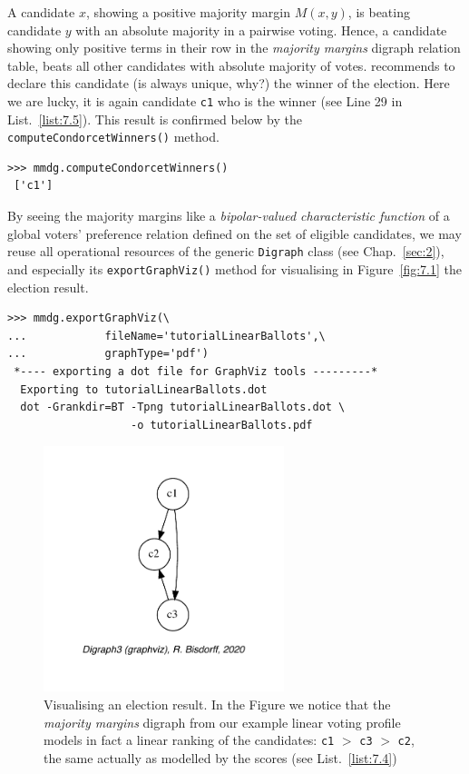 A candidate $x$, showing a positive majority margin $M(x,y)$, is beating candidate $y$  with an absolute majority in a pairwise voting. Hence, a candidate showing only positive terms in their row in the \emph{majority margins} digraph relation table, beats all other candidates with absolute majority of votes. \Condorcet recommends to declare this candidate (is always unique, why?) the winner of the election. Here we are lucky, it is again candidate \texttt{c1} who is the \Condorcet winner (see Line 29 in List.~\vref{list:7.5}). This result is confirmed below by the \texttt{computeCondorcetWinners()} method. 
\begin{lstlisting}
>>> mmdg.computeCondorcetWinners()
 ['c1']  
\end{lstlisting}    

By seeing the majority margins like a \emph{bipolar-valued characteristic function} of a global voters' preference relation defined on the set of eligible candidates, we may reuse all operational resources of the generic \texttt{Digraph} class (see Chap.~\ref{sec:2}), and especially its \texttt{exportGraphViz()} method for visualising in Figure~\vref{fig:7.1} the election result.
\begin{lstlisting}
>>> mmdg.exportGraphViz(\
...            fileName='tutorialLinearBallots',\
...            graphType='pdf')
 *---- exporting a dot file for GraphViz tools ---------*
  Exporting to tutorialLinearBallots.dot
  dot -Grankdir=BT -Tpng tutorialLinearBallots.dot \
                   -o tutorialLinearBallots.pdf
\end{lstlisting}
\begin{figure}[ht]
\sidecaption[t]
\includegraphics[width=7cm]{Figures/7-1-tutorialBallots.pdf}
\caption[Visualising an election result]{Visualising an election result. In the Figure we notice that the \emph{majority margins} digraph from our example linear voting profile models in fact a linear ranking of the candidates: \texttt{c1} $>$ \texttt{c3} $>$ \texttt{c2}, the same actually as modelled by the \Borda scores (see List.~\vref{list:7.4})}
\label{fig:7.1}       %
\end{figure}

